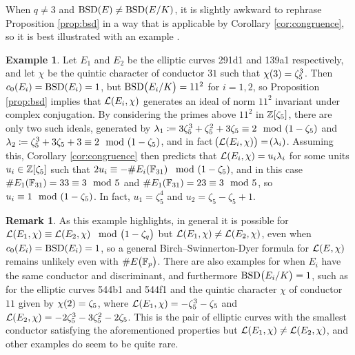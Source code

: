 \documentclass{article}
\theoremstyle{plain}
\theoremstyle{definition}
\newtheorem{example}[n]{Example}
\newtheorem{remark}[n]{Remark}
\newcommand{\BSD}{\operatorname{BSD}}
\newcommand{\FF}{\mathbb{F}}
\newcommand{\LLL}{\mathcal{L}}
\newcommand{\ZZ}{\mathbb{Z}}
\newcommand{\br}{\!\del}
\begin{document}
When $ q \ne 3 $ and $ \BSD\br{E} \ne \BSD\br[0]{E / K} $, it is slightly awkward to rephrase Proposition \ref{prop:bsd} in a way that is applicable by Corollary \ref{cor:congruence}, so it is best illustrated with an example \cite[Example 46]{DEW21}.

\begin{example}
Let $ E_1 $ and $ E_2 $ be the elliptic curves 291d1 and 139a1 respectively, and let $ \chi $ be the quintic character of conductor $ 31 $ such that $ \chi\br{3} = \zeta_5^3 $. Then $ c_0\br{E_i} = \BSD\br{E_i} = 1 $, but $ \BSD\br{E_i / K} = 11^2 $ for $ i = 1, 2 $, so Proposition \ref{prop:bsd} implies that $ \LLL\br{E_i, \chi} $ generates an ideal of norm $ 11^2 $ invariant under complex conjugation. By considering the primes above $ 11^2 $ in $ \ZZ\sbr{\zeta_5} $, there are only two such ideals, generated by $ \lambda_1 \coloneqq 3\zeta_5^3 + \zeta_5^2 + 3\zeta_5 \equiv 2 \mod \br{1 - \zeta_5} $ and $ \lambda_2 \coloneqq \zeta_5^3 + 3\zeta_5 + 3 \equiv 2 \mod \br{1 - \zeta_5} $, and in fact $ \br{\LLL\br{E_i, \chi}} = \br{\lambda_i} $. Assuming this, Corollary \ref{cor:congruence} then predicts that $ \LLL\br{E_i, \chi} = u_i\lambda_i $ for some units $ u_i \in \ZZ\sbr{\zeta_5} $ such that $ 2u_i \equiv -\#E_i\br{\FF_{31}} \mod \br{1 - \zeta_5} $, and in this case $ \#E_1\br{\FF_{31}} = 33 \equiv 3 \mod 5 $ and $ \#E_1\br{\FF_{31}} = 23 \equiv 3 \mod 5 $, so $ u_i \equiv 1 \mod \br{1 - \zeta_5} $. In fact, $ u_1 = \zeta_5^4 $ and $ u_2 = \zeta_5 - \zeta_5 + 1 $.
\end{example}

\begin{remark}
As this example highlights, in general it is possible for $ \LLL\br{E_1, \chi} \equiv \LLL\br{E_2, \chi} \mod \br{1 - \zeta_q} $ but $ \LLL\br{E_1, \chi} \ne \LLL\br{E_2, \chi} $, even when $ c_0\br{E_i} = \BSD\br{E_i} = 1 $, so a general Birch--Swinnerton-Dyer formula for $ \LLL\br{E, \chi} $ remains unlikely even with $ \#E\br{\FF_p} $. There are also examples for when $ E_i $ have the same conductor and discriminant, and furthermore $ \BSD\br{E_i / K} = 1 $, such as for the elliptic curves 544b1 and 544f1 and the quintic character $ \chi $ of conductor $ 11 $ given by $ \chi\br{2} = \zeta_5 $, where $ \LLL\br{E_1, \chi} = -\zeta_5^3 - \zeta_5 $ and $ \LLL\br{E_2, \chi} = -2\zeta_5^3 - 3\zeta_5^2 - 2\zeta_5 $. This is the pair of elliptic curves with the smallest conductor satisfying the aforementioned properties but $ \LLL\br{E_1, \chi} \ne \LLL\br{E_2, \chi} $, and other examples do seem to be quite rare.
\end{remark}
\end{document}
